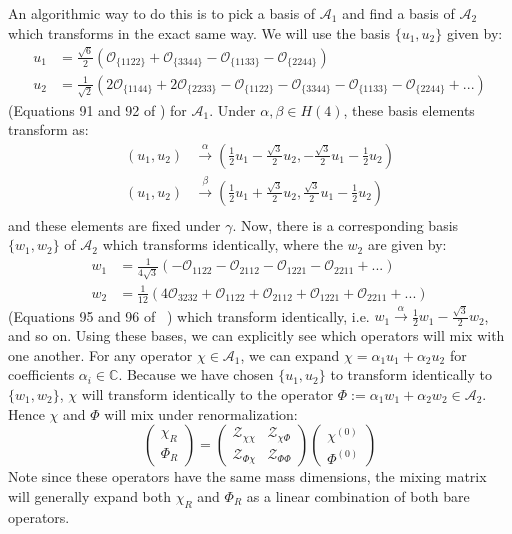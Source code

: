 \documentclass[11pt, oneside]{article}   	%
\theoremstyle{definition}
\begin{document}
An algorithmic way to do this is to pick a basis of $\mathcal A_1$ and find a basis of $\mathcal A_2$ 
which transforms in the exact same way. We will use the basis $\{u_1, u_2\}$ given by:
\begin{align}
	u_1 &= \frac{\sqrt{6}}{2}\left(\mathcal O_{\{1122\}} + \mathcal O_{\{3344\}} - \mathcal O_{\{1133\}} - 
	\mathcal O_{\{2244\}}\right) \\
	u_2 &= \frac{1}{\sqrt{2}}\left(2\mathcal O_{\{1144\}} + 2\mathcal O_{\{2233\}} - \mathcal O_{\{1122\}} - 
	\mathcal O_{\{3344\}} - \mathcal O_{\{1133\}} - \mathcal O_{\{2244\}} + ...\right)
\end{align}
(Equations 91 and 92 of \cite{gockeler_nucleon}) for $\mathcal A_1$. Under $\alpha, \beta\in H(4)$, these basis elements transform as:
\begin{align}
	(u_1, u_2) &\xrightarrow{\alpha} \left(\frac{1}{2}u_1 - \frac{\sqrt{3}}{2}u_2, -\frac{\sqrt 3}{2}u_1 - \frac{1}{2}u_2\right) \\
	(u_1, u_2) &\xrightarrow{\beta} \left(\frac{1}{2}u_1 + \frac{\sqrt 3}{2}u_2, \frac{\sqrt 3}{2}u_1 - \frac{1}{2}u_2\right) \\
\end{align}
and these elements are fixed under $\gamma$. Now, there is a corresponding basis $\{w_1, w_2\}$ of $\mathcal A_2$ 
which transforms identically, where the $w_2$ are given by:
\begin{align}
	w_1 &= \frac{1}{4\sqrt 3}\left(-\mathcal O_{1122} - \mathcal O_{2112} - \mathcal O_{1221} - \mathcal O_{2211} 
	+ ... \right) \\
	w_2 &= \frac{1}{12}\left(4\mathcal O_{3232} + \mathcal O_{1122} + \mathcal O_{2112} + \mathcal O_{1221} 
	+ \mathcal O_{2211} + ...\right)
\end{align}
(Equations 95 and 96 of ~\cite{gockeler_nucleon}) which transform identically, i.e. $w_1\xrightarrow{\alpha} 
\frac{1}{2} w_1 - \frac{\sqrt 3}{2} w_2$, and so on. Using these bases, we can explicitly see which operators will mix with 
one another. For any operator $\chi\in\mathcal A_1$, we can expand $\chi = \alpha_1 u_1 + \alpha_2 u_2$ for 
coefficients $\alpha_i\in\mathbb C$. Because we have chosen $\{u_1, u_2\}$ to transform identically to $\{w_1, w_2\}$, 
$\chi$ will transform identically to the operator $\Phi := \alpha_1 w_1 + \alpha_2 w_2\in \mathcal A_2$. Hence $\chi$ and 
$\Phi$ will mix under renormalization:
\begin{equation}
	\begin{pmatrix} \chi_R \\ \Phi_R \end{pmatrix} = 
	\begin{pmatrix} \mathcal Z_{\chi\chi} & \mathcal Z_{\chi\Phi} \\ 
	\mathcal Z_{\Phi\chi} & \mathcal Z_{\Phi\Phi} \end{pmatrix}
	\begin{pmatrix} \chi^{(0)} \\ \Phi^{(0)} \end{pmatrix}
\end{equation}
Note since these operators have the same mass dimensions, the mixing matrix will generally expand both $\chi_R$ and 
$\Phi_R$ as a linear combination of both bare operators. 
\end{document}
